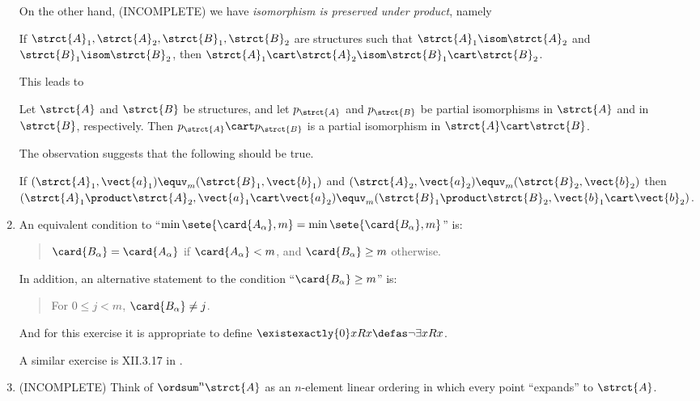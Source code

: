 \begin{enumerate}[1.]
On the other hand, (INCOMPLETE) we have \emph{isomorphism is preserved under product}, namely
\begin{fact}
If $\strct{A}_1, \strct{A}_2, \strct{B}_1, \strct{B}_2$ are structures such that $\strct{A}_1 \isom \strct{A}_2$ and $\strct{B}_1 \isom \strct{B}_2$, then $\strct{A}_1 \cart \strct{A}_2 \isom \strct{B}_1 \cart \strct{B}_2$.
\end{fact}
This leads to
\begin{observation}
Let $\strct{A}$ and $\strct{B}$ be structures, and let $p_\strct{A}$ and $p_\strct{B}$ be partial isomorphisms in $\strct{A}$ and in $\strct{B}$, respectively. Then $p_\strct{A} \cart p_\strct{B}$ is a partial isomorphism in $\strct{A} \cart \strct{B}$.
\end{observation}
The observation suggests that the following should be true.
\begin{conjecture}
If $(\strct{A}_1, \vect{a}_1) \equv_m (\strct{B}_1, \vect{b}_1)$ and $(\strct{A}_2, \vect{a}_2) \equv_m (\strct{B}_2, \vect{b}_2)$ then $(\strct{A}_1 \product \strct{A}_2, \vect{a}_1 \cart \vect{a}_2) \equv_m (\strct{B}_1 \product \strct{B}_2, \vect{b}_1 \cart \vect{b}_2)$.
\end{conjecture}
%
\item {} An equivalent condition to ``$\min\sete{\card{A_\alpha}, m} = \min\sete{\card{B_\alpha}, m}$'' is:
\begin{quote}
$\card{B_\alpha} = \card{A_\alpha}$ if $\card{A_\alpha} < m$, and $\card{B_\alpha} \geq m$ otherwise.
\end{quote}
In addition, an alternative statement to the condition ``$\card{B_\alpha} \geq m$'' is:
\begin{quote}
For $0 \leq j < m$, $\card{B_\alpha} \neq j$.
\end{quote}
And for this exercise it is appropriate to define $\existexactly{0}x Rx \defas \neg\exists x Rx$.
\begin{remark}
A similar exercise is XII.3.17 in \cite{EFT}.
\end{remark}
%
\item {} (INCOMPLETE)
Think of $\ordsum^n \strct{A}$ as an $n$-element linear ordering in which every point ``expands'' to $\strct{A}$.


\end{enumerate}
